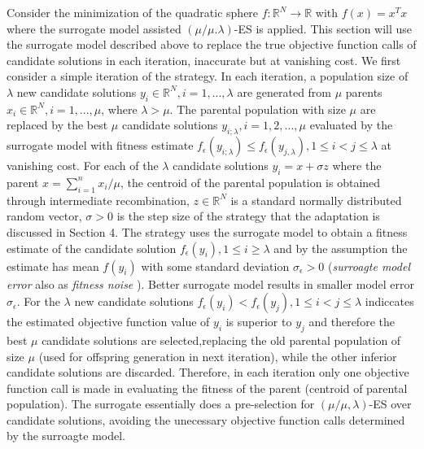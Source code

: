 Consider the minimization of the quadratic sphere $f: \mathbb R^N \rightarrow \mathbb R$ with $f(x)=x^Tx$ where the surrogate model assisted $(\mu/\mu.\lambda)$-ES is applied. This section will use the surrogate model described above to replace the true objective function calls of candidate solutions in each iteration, inaccurate but at vanishing cost. We first consider a simple iteration of the strategy. In each iteration, a population size of $\lambda$ new candidate solutions $y_i \in \mathbb{R}^N,i = 1,...,\lambda $ are generated from $\mu$ parents $x_i \in \mathbb{R}^N, i=1,...,\mu$, where $\lambda>\mu$. The parental population with size $\mu$ are replaced by the best $\mu$ candidate solutions $y_{i;\lambda},i = 1,2,...,\mu$ evaluated by the surrogate model with fitness estimate $f_{\epsilon}(y_{i;\lambda}) \leq f_{\epsilon}(y_{j,\lambda}), 1 \leq i < j \leq \lambda$ at vanishing cost. For each of the $\lambda$ candidate solutions $y_i=x + \sigma z$ where the parent $x = \sum_{i=1}^n x_i/\mu$, the centroid of the parental population is obtained through intermediate recombination, $z \in  \mathbb R^N$ is a standard normally distributed random vector, $\sigma > 0$ is the step size of the strategy that the adaptation is discussed in Section 4. The strategy uses the surrogate model to obtain a fitness estimate of the candidate solution $f_{\epsilon} (y_i), 1 \leq i \geq \lambda$ and by the assumption the estimate has mean $f(y_i)$ with some standard deviation $\sigma_\epsilon > 0$ (\textit{surroagte model error} also as \textit{fitness noise} \cite{1284729}). Better surrogate model results in smaller model error $\sigma_\epsilon$. For the $\lambda$ new candidate solutions $f_\epsilon (y_i) < f_\epsilon (y_j), 1 \leq i < j \leq \lambda$ indiccates the estimated objective function value of $y_i$ is superior to $y_j$ and therefore the best $\mu$ candidate solutions are selected,replacing the old parental population of size $\mu$ (used for offspring generation in next iteration), while the other inferior candidate solutions are discarded. Therefore, in each iteration only one objective function call is made in evaluating the fitness of the parent (centroid of parental population). The surrogate essentially does a pre-selection for $(\mu/\mu,\lambda)$-ES over candidate solutions, avoiding the unecessary objective function calls determined by the surroagte model.  


